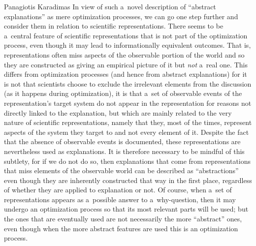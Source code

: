 \begin{artengenv}{Panagiotis Karadimas}
In view of such a~novel description of ``abstract explanations'' as mere optimization processes, we can go one step further and consider them in relation to scientific representations. There seems to be a~central feature of scientific representations that is not part of the optimization process, even though it may lead to informationally equivalent outcomes. That is, representations often miss aspects of the observable portion of the world and so they are constructed as giving an empirical picture of it but \textit{not} a~real one. This differs from optimization processes (and hence from abstract explanations) for it is not that scientists choose to exclude the irrelevant elements from the discussion (as it happens during optimization), it is that a~set of observable events of the representation's target system do not appear in the representation for reasons not directly linked to the explanation, but which are mainly related to the very nature of scientific representations, namely that they, most of the times, represent aspects of the system they target to and not every element of it. Despite the fact that the absence of observable events is documented, these representations are nevertheless used as explanations. It is therefore necessary to be mindful of this subtlety, for if we do not do so, then explanations that come from representations that miss elements of the observable world can be described as ``abstractions'' even though they are inherently constructed that way in the first place, regardless of whether they are applied to explanation or not. Of course, when a~set of representations appears as a~possible answer to a~why-question, then it may undergo an optimization process so that its most relevant parts will be used; but the ones that are eventually used are not necessarily the more ``abstract'' ones, even though when the more abstract features are used this is an optimization process.


\end{artengenv}
